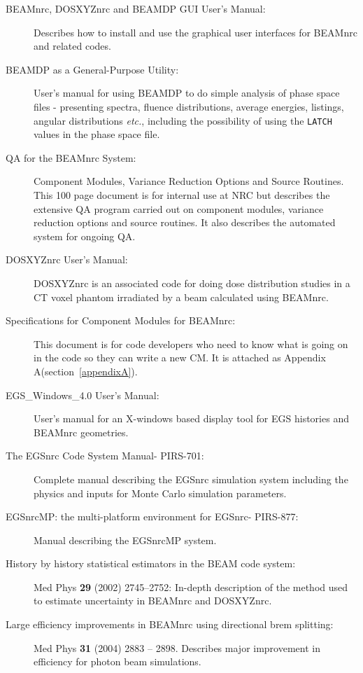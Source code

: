 \documentclass[12pt,twoside]{article}
\newcommand{\etc}{{\em etc.}}
\begin{document}
\begin{description}

 
\item [BEAMnrc, DOSXYZnrc and BEAMDP GUI User's Manual:] Describes how to
install and use the graphical user interfaces for BEAMnrc and
related codes\cite{Tr04}.

\item [BEAMDP as a General-Purpose Utility:] User's manual for using
BEAMDP to do simple analysis of phase space files - presenting spectra,
fluence distributions, average energies, listings, angular distributions
\etc, including the possibility of using the {\tt LATCH} values in the phase
space file\cite{Ma95b}.

\item [QA for the BEAMnrc System:] Component Modules, Variance Reduction
Options and Source Routines. This 100 page document is for internal use
at NRC but describes the extensive QA program carried out on component
modules, variance reduction
options and source routines. It also describes
the automated system for ongoing QA\cite{WR95a}.

\item [DOSXYZnrc User's Manual:] DOSXYZnrc is an associated code for doing dose
distribution studies in a CT voxel phantom irradiated by a beam
calculated using BEAMnrc\cite{Wa05}.

\item[Specifications for Component Modules for BEAMnrc:] This document is
for code developers who need to know what is going on in
the code so they can write a new CM. It is attached as Appendix
A(section~\ref{appendixA}).

\item[EGS\_Windows\_4.0 User's Manual:] User's manual for an X-windows based
display tool for EGS histories and BEAMnrc geometries\cite{TR99a}.

\item[The EGSnrc Code System Manual- PIRS-701:] Complete manual describing
the EGSnrc simulation system including the physics and inputs for Monte Carlo
simulation parameters\cite{KR03}.

\item[EGSnrcMP: the multi-platform environment for EGSnrc- PIRS-877:] Manual
describing the EGSnrcMP system\cite{Ka03}.

\item[History by history statistical estimators in the BEAM code system:]
Med Phys {\bf 29} (2002) 2745--2752: In-depth description of the method used
to estimate uncertainty in BEAMnrc and DOSXYZnrc\cite{Wa02a}.

\item[Large efficiency improvements in BEAMnrc using directional
brem splitting:~~~] Med Phys {\bf 31} (2004) 2883 -- 2898. Describes
major improvement in efficiency for photon beam simulations\cite{Ka04a}.
 


\end{description}
\end{document}
